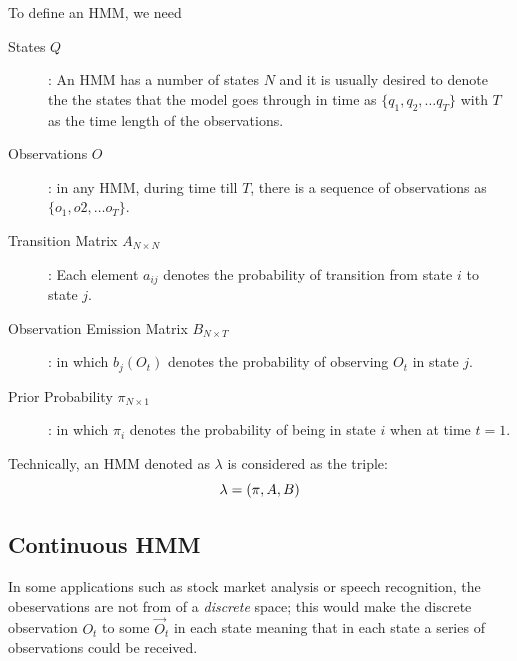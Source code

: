 \documentclass{acm_proc_article-sp}
\begin{document}
To define an HMM, we need
\begin{description}
\item[States $Q$]: An HMM has a number of states $N$ and it is usually desired to denote the the states that the model
goes through in time as $\{q_1, q_2, \ldots q_T\}$ with $T$ as the time length of the observations.
\item[Observations $O$]: in any HMM, during time till $T$, there is a sequence of observations as $\{o_1, o2, \ldots
o_T\}$.
\item[Transition Matrix $A_{N \times N}$]: Each element $a_{ij}$ denotes the probability of transition from state $i$
to state $j$.
\item[Observation Emission Matrix $B_{N \times T}$]: in which $b_j(O_t)$ denotes the probability of observing $O_t$ in
state $j$.
\item[Prior Probability $\pi_{N \times 1}$]: in which $\pi_i$ denotes the probability of being in state $i$ when at
time $t = 1$.
\end{description}
Technically, an HMM denoted as $\lambda$ is considered as the triple:
\begin{equation}
\boldmath{\lambda = (\pi, A, B)}
\end{equation} 

\subsection{Continuous HMM}
In some applications such as stock market analysis or speech recognition, the obeservations are not from of a
\textit{discrete} space; this would make the discrete observation $O_t$ to some $\vec{O}_t$ in each state meaning that
in each state a series of observations could be received.
\end{document}
